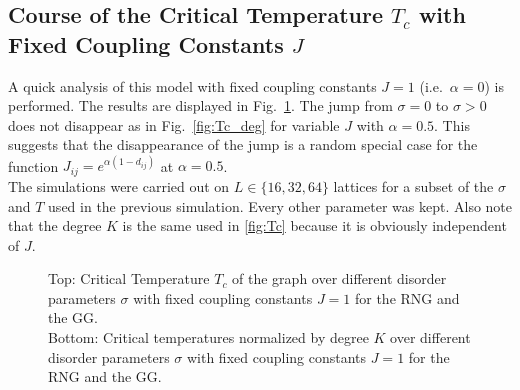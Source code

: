 \subsection{Course of the Critical Temperature $T_c$ with Fixed Coupling Constants $J$}
\label{appendix:fixedCoupling}
    A quick analysis of this model with fixed coupling constants \(J = 1\)
    (i.e.\ \(\alpha=0\)) is performed. The results are displayed in Fig.\ \ref{fig:Tc_deg_A0}.
    The jump from \(\sigma=0\) to \(\sigma>0\) does not disappear as in Fig.\ \ref{fig:Tc_deg}
    for variable \(J\) with \(\alpha=0.5\). This suggests that the
    disappearance of the jump is a random special case for the function
    \(J_{ij}=e^{\alpha(1-d_{ij})}\) at \(\alpha=0.5\).\\
    The simulations were carried out on \(L \in \{16,32,64\}\) lattices
    for a subset of the \(\sigma\) and \(T\) used in the previous simulation.
    Every other parameter was kept. Also note that the degree \(K\) is
    the same used in \ref{fig:Tc}
    because it is obviously independent of \(J\).
    \begin{figure}[htbp]
        \centering


        \caption[Critical Temperature and Critical Temperature Normalized by Degree of the Graph for Fixed Coupling Constants $J=1$]
        {
            Top: Critical Temperature \(T_c\) of the graph over different
            disorder parameters \(\sigma\) with fixed coupling constants \(J=1\) for
             the RNG and
             the GG.\\
            Bottom: Critical temperatures normalized by degree \(K\) over
            different disorder parameters \(\sigma\) with fixed coupling constants \(J=1\) for
             the RNG and
             the GG.
        }
        \label{fig:Tc_deg_A0}
    \end{figure}\\
